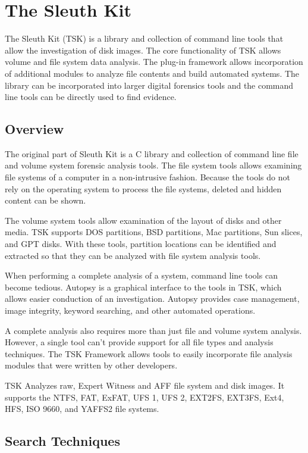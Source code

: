 \section{The Sleuth Kit}

The Sleuth Kit (TSK) is a library and collection of command line tools that allow the
investigation of disk images. The core functionality of TSK allows volume and file system data analysis.
The plug-in framework allows incorporation of additional modules to analyze file contents
and build automated systems. The library can be incorporated into larger digital forensics tools and
the command line tools can be directly used to find evidence.

\subsection{Overview}

The original part of Sleuth Kit is a C library and collection of command line
file and volume system forensic analysis tools. The file system tools allows examining file systems
of a computer in a non-intrusive fashion. Because the tools do not rely on the operating system to process
the file systems, deleted and hidden content can be shown.

The volume system tools allow examination of the layout of disks
and other media. TSK supports DOS partitions, BSD partitions, Mac partitions, Sun slices, and 
GPT disks. With these tools, partition locations can be identified 
and extracted so that they can be analyzed with file system analysis tools.

When performing a complete analysis of a system, command line 
tools can become tedious. Autopsy is a graphical interface to the tools in TSK, 
which allows easier conduction of an investigation. Autopsy 
provides case management, image integrity, keyword searching, and other automated
operations.

A complete analysis also requires more than just file and volume system analysis.
However, a single tool can't provide support for all file types and analysis 
techniques. The TSK Framework allows tools to easily incorporate file analysis
modules that were written by other developers.

TSK Analyzes raw, Expert Witness and AFF file system and disk images.
It supports the NTFS, FAT, ExFAT, UFS 1, UFS 2, EXT2FS, EXT3FS, Ext4, HFS, ISO 9660,
and YAFFS2 file systems.

\subsection{Search Techniques}

